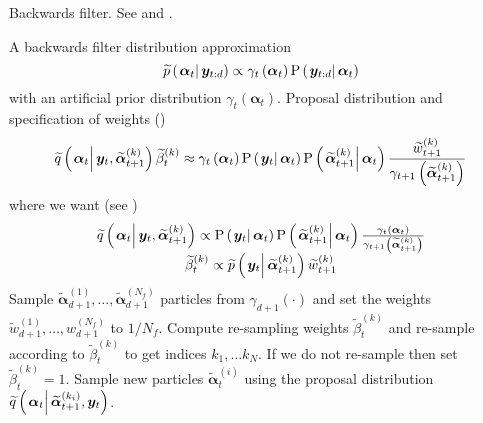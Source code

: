 \documentclass[notitlepage]{article}
\renewcommand{\vec}[1]{\bm{#1}}
\newcommand{\Lparen}[1]{\left( #1\right)}
\newcommand{\Cond}[2]{\left. #1 \vphantom{#2} \right\vert  #2}
\newcommand{\Prob}{\text{P}}
\newcommand{\optor}[2]{#1\Lparen{#2}}
\newcommand{\optorC}[3]{\optor{#1}{\Cond{#2}{#3}}}
\newcommand{\propC}[2]{\optorC{\Prob}{#1}{#2}}
\newcommand{\propAproxC}[2]{\optorC{\widetilde{p}}{#1}{#2}}
\newcommand{\IDAproxC}[2]{\optorC{\widetilde{q}}{#1}{#2}}
\newcommand{\partic}[3]{#1_{#2}^{\Lparen{#3}}}
\newcommand{\particB}[3]{\widetilde{#1}_{#2}^{\Lparen{#3}}}
\newcommand{\nPart}{N}
\newcommand{\nPeriods}{d}
\begin{document}
\begin{algorithm}[H]
\caption{Backwards filter. See \cite{briers09} and \cite{fearnhead10}.}\label{alg:backward}
\begin{algorithmic}[1]\raggedright
\INPUT
\Statex A backwards filter distribution approximation
\begin{equation}
	\propAproxC{\vec{\alpha}_t}{\vec{y}_{t:\nPeriods}} \propto \gamma_t \Lparen{\vec{\alpha}_t}\propC{\vec{y}_{t:\nPeriods}}{\vec{\alpha}_t}
\end{equation}
\Statex with an  artificial prior distribution $\gamma_t \Lparen{\vec{\alpha}_t}$. 
\Statex Proposal distribution and specification of weights (\citet[page 451 -- look in the example in the appendix]{fearnhead10})
\Statex\begin{equation}
	\IDAproxC{\vec{\alpha}_t}{\vec{y}_t, \particB{\vec{\alpha}}{t + 1}{k}}\particB{\beta}{t}{k} \approx %
		\gamma_t\Lparen{\vec{\alpha}_t}
		\propC{\vec{y}_t}{\vec{\alpha}_t}
		\propC{\particB{\vec{\alpha}}{t + 1}{k}}{\vec{\alpha}_t}
		\frac{\particB{w}{t + 1}{k}}{\gamma_{t + 1}\Lparen{\particB{\vec{\alpha}}{t + 1}{k}}}
\end{equation}
\Statex where we want (see \citet[page 74]{briers09})
\Statex\begin{equation}\begin{matrix}
	\IDAproxC{\vec{\alpha}_t}{\vec{y}_t, \particB{\vec{\alpha}}{t + 1}{k}} \propto %
		\propC{\vec{y}_t}{\vec{\alpha}_t}
		\propC{\particB{\vec{\alpha}}{t + 1}{k}}{\vec{\alpha}_t}
		\frac{\gamma_t\Lparen{\vec{\alpha}_t}}{\gamma_{t + 1}\Lparen{\particB{\vec{\alpha}}{t + 1}{k}}} \\
	\particB{\beta}{t}{k} \propto %
		 \propAproxC{\vec{y}_t}{\particB{\vec{\alpha}}{t + 1}{k}}\particB{w}{t + 1}{k}
\end{matrix}\end{equation}
%
\State Sample $\particB{\vec{\alpha}}{\nPeriods+1}{1},\dots,\particB{\vec{\alpha}}{\nPeriods+1}{\nPart_f}$ particles from $\gamma_{\nPeriods+1}(\cdot)$ and set the weights $\particB{w}{\nPeriods + 1}{1},\dots,\partic{w}{\nPeriods+1}{\nPart_f}$ to $1 / \nPart_f$.
%
\For{$t=\nPeriods,\dots, 1$}
\State Compute re-sampling weights $\particB{\beta}{t}{k}$ and re-sample according to $\particB{\beta}{t}{k}$ to get indices $k_1,\dots k_\nPart$. If we do not re-sample then set $\particB{\beta}{t}{k} = 1$.
\EndProcedure
%
\State Sample new particles $\particB{\vec{\alpha}}{t}{i}$ using the proposal distribution $\IDAproxC{\vec{\alpha}_t}{\particB{\vec{\alpha}}{t + 1}{k_i}, \vec{y}_t}$.

\end{algorithmic}
\end{algorithm}
\end{document}
